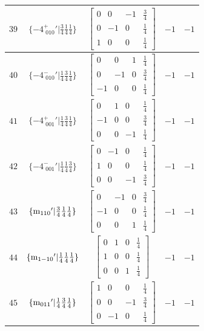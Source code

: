 \documentclass[fleqn,8pt]{jsarticle}
\begin{document}
\begin{longtable}{ccccc}
$ 39 $ & $ \{-4^{+}_{\,\,010}{}'|\frac{3}{4} \frac{1}{4} \frac{1}{4}\} $ & $ \begin{bmatrix} 0 & 0 & -1 & \frac{3}{4} \\ 0 & -1 & 0 & \frac{1}{4} \\ 1 & 0 & 0 & \frac{1}{4} \end{bmatrix} $ & $ -1 $ & $ -1 $ \\ \hline
$ 40 $ & $ \{-4^{-}_{\,\,010}{}'|\frac{1}{4} \frac{3}{4} \frac{1}{4}\} $ & $ \begin{bmatrix} 0 & 0 & 1 & \frac{1}{4} \\ 0 & -1 & 0 & \frac{3}{4} \\ -1 & 0 & 0 & \frac{1}{4} \end{bmatrix} $ & $ -1 $ & $ -1 $ \\ \hline
$ 41 $ & $ \{-4^{+}_{\,\,001}{}'|\frac{1}{4} \frac{3}{4} \frac{1}{4}\} $ & $ \begin{bmatrix} 0 & 1 & 0 & \frac{1}{4} \\ -1 & 0 & 0 & \frac{3}{4} \\ 0 & 0 & -1 & \frac{1}{4} \end{bmatrix} $ & $ -1 $ & $ -1 $ \\ \hline
$ 42 $ & $ \{-4^{-}_{\,\,001}{}'|\frac{1}{4} \frac{1}{4} \frac{3}{4}\} $ & $ \begin{bmatrix} 0 & -1 & 0 & \frac{1}{4} \\ 1 & 0 & 0 & \frac{1}{4} \\ 0 & 0 & -1 & \frac{3}{4} \end{bmatrix} $ & $ -1 $ & $ -1 $ \\ \hline
$ 43 $ & $ \{{\rm m}_{110}{}'|\frac{3}{4} \frac{1}{4} \frac{1}{4}\} $ & $ \begin{bmatrix} 0 & -1 & 0 & \frac{3}{4} \\ -1 & 0 & 0 & \frac{1}{4} \\ 0 & 0 & 1 & \frac{1}{4} \end{bmatrix} $ & $ -1 $ & $ -1 $ \\ \hline
$ 44 $ & $ \{{\rm m}_{1-10}{}'|\frac{1}{4} \frac{1}{4} \frac{1}{4}\} $ & $ \begin{bmatrix} 0 & 1 & 0 & \frac{1}{4} \\ 1 & 0 & 0 & \frac{1}{4} \\ 0 & 0 & 1 & \frac{1}{4} \end{bmatrix} $ & $ -1 $ & $ -1 $ \\ \hline
$ 45 $ & $ \{{\rm m}_{011}{}'|\frac{1}{4} \frac{3}{4} \frac{1}{4}\} $ & $ \begin{bmatrix} 1 & 0 & 0 & \frac{1}{4} \\ 0 & 0 & -1 & \frac{3}{4} \\ 0 & -1 & 0 & \frac{1}{4} \end{bmatrix} $ & $ -1 $ & $ -1 $ \\ \hline

\end{longtable}
\end{document}
